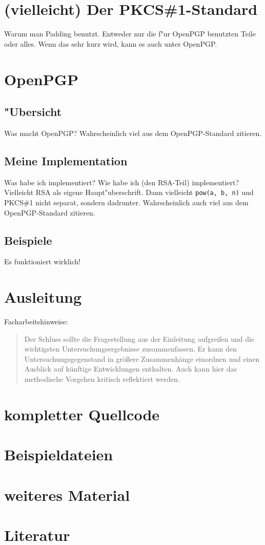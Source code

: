 \documentclass[12pt]{article}
\begin{document}
\section{(vielleicht) Der PKCS\#1-Standard}
Warum man Padding benutzt. Entweder nur die f"ur OpenPGP benutzten Teile oder alles. Wenn das sehr kurz wird, kann es auch unter OpenPGP.

\section{OpenPGP}
\subsection{"Ubersicht}
Was macht OpenPGP?
Wahrscheinlich viel aus dem OpenPGP-Standard zitieren. 
\subsection{Meine Implementation}
Was habe ich implementiert? Wie habe ich (den RSA-Teil) implementiert?
Vielleicht RSA als eigene Haupt"uberschrift. Dann vielleicht \verb|pow(a, b, n)| und PKCS\#1 nicht separat, sondern dadrunter.
Wahrscheinlich auch viel aus dem OpenPGP-Standard zitieren. 
\subsection{Beispiele}
Es funktioniert wirklich!

\section{Ausleitung}
Facharbeitshinweise:
\begin{quote}
Der Schluss sollte die Fragestellung aus der Einleitung aufgreifen und die wichtigsten Untersuchungsergebnisse zusammenfassen. Er kann den Untersuchungsgegenstand in größere Zusammenhänge einordnen und einen Ausblick auf künftige Entwicklungen enthalten. Auch kann hier das methodische Vorgehen kritisch reflektiert werden.
\end{quote}

\appendix

\section{kompletter Quellcode}

\section{Beispieldateien}

\section{weiteres Material}

\section{Literatur}
\end{document}
